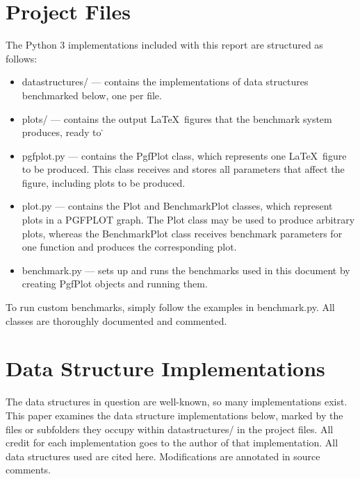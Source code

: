 \documentclass{article}
\begin{document}
\section{Project Files}
The Python 3 implementations included with this report are structured as follows:
\begin{itemize}
    \item datastructures/ --- contains the implementations of data structures benchmarked below, one per file.
    \item plots/ --- contains the output \LaTeX \ figures that the benchmark system produces, ready to \.
    \item pgfplot.py --- contains the PgfPlot class, which represents one \LaTeX \ figure to be produced. This class receives and stores all parameters that affect the figure, including plots to be produced.
    \item plot.py --- contains the Plot and BenchmarkPlot classes, which represent plots in a PGFPLOT graph. The Plot class may be used to produce arbitrary plots, whereas the BenchmarkPlot class receives benchmark parameters for one function and produces the corresponding plot.
    \item benchmark.py --- sets up and runs the benchmarks used in this document by creating PgfPlot objects and running them.
\end{itemize}

To run custom benchmarks, simply follow the examples in benchmark.py. All classes are thoroughly documented and commented.

\section{Data Structure Implementations}
The data structures in question are well-known, so many implementations exist. This paper examines the data structure implementations below, marked by the files or subfolders they occupy within datastructures/ in the project files. All credit for each implementation goes to the author of that implementation. All data structures used are cited here. Modifications are annotated in source comments.
\end{document}
